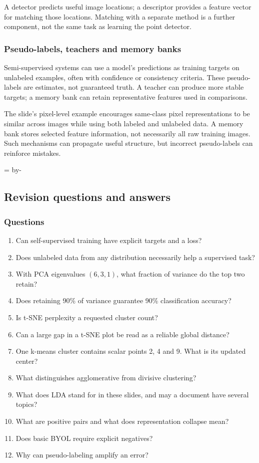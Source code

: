 \documentclass[11pt]{article}
\newcommand{\newsubsection}[1]{\par\begingroup\skip0=\pagegoal\advance\skip0 by-\pagetotal\ifdim\skip0<12\baselineskip\newpage\fi\endgroup\subsection{#1}}
\begin{document}
A detector predicts useful image locations; a descriptor provides a feature vector for matching those locations. Matching with a separate method is a further component, not the same task as learning the point detector.

\subsubsection{Pseudo-labels, teachers and memory banks}
Semi-supervised systems can use a model's predictions as training targets on unlabeled examples, often with confidence or consistency criteria. These pseudo-labels are estimates, not guaranteed truth. A teacher can produce more stable targets; a memory bank can retain representative features used in comparisons.

The slide's pixel-level example encourages same-class pixel representations to be similar across images while using both labeled and unlabeled data. A memory bank stores selected feature information, not necessarily all raw training images. Such mechanisms can propagate useful structure, but incorrect pseudo-labels can reinforce mistakes.

\newsubsection{Revision questions and answers}
\subsubsection{Questions}
\begin{enumerate}
\item Can self-supervised training have explicit targets and a loss?
\item Does unlabeled data from any distribution necessarily help a supervised task?
\item With PCA eigenvalues $(6,3,1)$, what fraction of variance do the top two retain?
\item Does retaining 90\% of variance guarantee 90\% classification accuracy?
\item Is t-SNE perplexity a requested cluster count?
\item Can a large gap in a t-SNE plot be read as a reliable global distance?
\item One k-means cluster contains scalar points 2, 4 and 9. What is its updated center?
\item What distinguishes agglomerative from divisive clustering?
\item What does LDA stand for in these slides, and may a document have several topics?
\item What are positive pairs and what does representation collapse mean?
\item Does basic BYOL require explicit negatives?
\item Why can pseudo-labeling amplify an error?
\end{enumerate}
\end{document}
